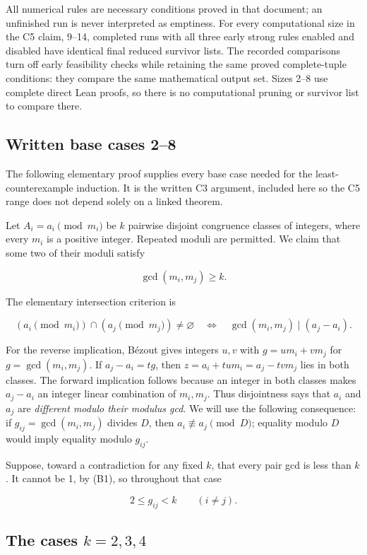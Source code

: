 \documentclass[11pt,a4paper]{article}
\begin{document}
All numerical rules are necessary conditions proved in that document; an unfinished run is never interpreted as emptiness. For every computational size in the C5 claim, 9--14, completed runs with all three early strong rules enabled and disabled have identical final reduced survivor lists. The recorded comparisons turn off early feasibility checks while retaining the same proved complete-tuple conditions: they compare the same mathematical output set. Sizes 2--8 use complete direct Lean proofs, so there is no computational pruning or survivor list to compare there.

\subsection{Written base cases 2--8}\label{written-base-cases-28}

The following elementary proof supplies every base case needed for the least-counterexample induction. It is the written C3 argument, included here so the C5 range does not depend solely on a linked theorem.

Let \(A_i=a_i\pmod{m_i}\) be \(k\) pairwise disjoint congruence classes of integers, where every \(m_i\) is a positive integer. Repeated moduli are permitted. We claim that some two of their moduli satisfy

\[
\gcd(m_i,m_j)\ge k.
\]

The elementary intersection criterion is

\[
(a_i\pmod{m_i})\cap(a_j\pmod{m_j})\ne\varnothing
\quad\Longleftrightarrow\quad
\gcd(m_i,m_j)\mid(a_j-a_i).
\tag{B1}
\]

For the reverse implication, B\'{e}zout gives integers \(u,v\) with \(g=u m_i+v m_j\) for \(g=\gcd(m_i,m_j)\). If \(a_j-a_i=tg\), then \(z=a_i+tum_i=a_j-tvm_j\) lies in both classes. The forward implication follows because an integer in both classes makes \(a_j-a_i\) an integer linear combination of \(m_i,m_j\). Thus disjointness says that \(a_i\) and \(a_j\) are \emph{different modulo their modulus gcd}. We will use the following consequence: if \(g_{ij}=\gcd(m_i,m_j)\) divides \(D\), then \(a_i\not\equiv a_j\pmod D\); equality modulo \(D\) would imply equality modulo \(g_{ij}\).

Suppose, toward a contradiction for any fixed \(k\), that every pair gcd is less than \(k\). It cannot be 1, by (B1), so throughout that case

\[
2\le g_{ij}<k\qquad(i\ne j).
\tag{B2}
\]

\subsection{\texorpdfstring{The cases \(k=2,3,4\)}{The cases k=2,3,4}}\label{the-cases-k234}
\end{document}
